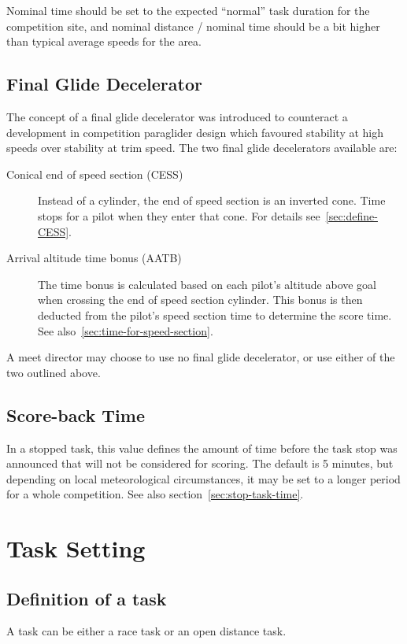 \documentclass{article}
\begin{document}
Nominal time should be set to the expected “normal” task duration for the
competition site, and nominal distance / nominal time should be a bit higher
than typical average speeds for the area.

\begin{pg}
\subsection{Final Glide Decelerator}
\label{sec:final-glide-decelerator}
The concept of a final glide decelerator was introduced to counteract
a development in competition paraglider design which favoured stability at high
speeds over stability at trim speed. The two final glide decelerators available
are:
\begin{description}
    \item [Conical end of speed section (CESS)]
        Instead of a cylinder, the end of speed section is an inverted cone.
        Time stops for a pilot when they enter that cone. For details
        see~\ref{sec:define-CESS}.
    \item [Arrival altitude time bonus (AATB)]
        The time bonus is calculated based on each pilot’s altitude above goal
        when crossing the end of speed section cylinder. This bonus is then
        deducted from the pilot’s speed section time to determine the score
        time. See also~\ref{sec:time-for-speed-section}.
\end{description}
A meet director may choose to use no final glide decelerator, or use either of
the two outlined above.
\end{pg}

\begin{pg}
\subsection{Score-back Time}
\label{sec:score-back-time}
In a stopped task, this value defines the amount of time before the task stop
was announced that will not be considered for scoring. The default is
5 minutes, but depending on local meteorological circumstances, it may be set
to a longer period for a whole competition. See also section~\ref{sec:stop-task-time}.
\end{pg}

\newpage
\section{Task Setting}
\label{sec:task-setting}
\subsection{Definition of a task}
\label{sec:task-definition}
A task can be either a race task or an open distance task.
\end{document}
